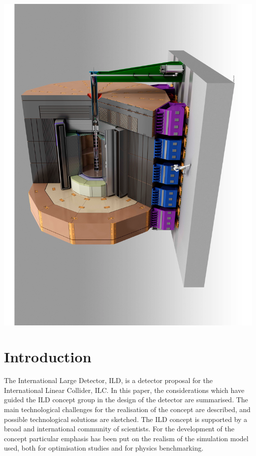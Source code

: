 \documentclass[%
 amsmath,amssymb,
 aps,
 longbibliography,
]{revtex4-1}
\begin{document}

\begin{center}

\includegraphics[width=0.8\hsize]{figures/ILD.pdf}
\end{center}

\maketitle




\section{\label{sec:level1}Introduction}
The International Large Detector, ILD, is a detector proposal for the International Linear Collider, ILC. In this paper, the considerations which have guided the ILD concept group in the design of the detector are summarised. The main technological challenges for the realisation of the concept are described, and possible technological solutions are sketched. The ILD concept is supported by a broad and international community of scientists. For the development of the concept particular emphasis has been put on the realism of the simulation model used, both for optimisation studies and for physics benchmarking.
\end{document}
